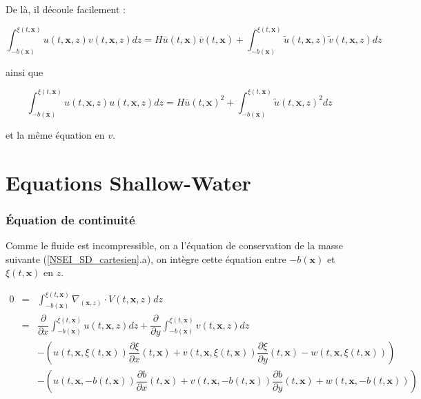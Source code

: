 \documentclass[10pt,a4paper]{amsart}
\def\gint{\displaystyle\int}
\begin{document}
De là, il découle facilement :

\begin{equation} \label{integrale1}
\gint_{-b(\textbf{x})}^{\xi(t,\textbf{x})} u(t,\textbf{x},z) v(t,\textbf{x},z) dz = H \overline{u}(t,\textbf{x}) \overline{v}(t,\textbf{x}) + \gint_{-b(\textbf{x})}^{\xi(t,\textbf{x})} \widetilde{u}(t,\textbf{x},z) \widetilde{v}(t,\textbf{x},z) dz
\end{equation}

ainsi que 

\begin{equation} \label{integrale2}
\gint_{-b(\textbf{x})}^{\xi(t,\textbf{x})} u(t,\textbf{x},z) u(t,\textbf{x},z) dz = H \overline{u}(t,\textbf{x})^2 + \gint_{-b(\textbf{x})}^{\xi(t,\textbf{x})} \widetilde{u}(t,\textbf{x},z)^2 dz
\end{equation}

et la même équation en $v$.

\part{Equations Shallow-Water} 

\section{\'Equation de continuité}


Comme le fluide est incompressible, on a l'équation de conservation de la masse suivante (\ref{NSEI_SD_cartesien}.a), on intègre cette équation entre $-b(\textbf{x})$ et $\xi(t,\textbf{x})$ en $z$.

$$\begin{array}{rcl}
0 & = & \gint_{-b(\textbf{x})}^{\xi(t,\textbf{x})}\nabla_{(\textbf{x},z)} \cdot V(t,\textbf{x},z) dz\\
  & = & \dfrac{\partial}{\partial x} \gint_{-b(\textbf{x})}^{\xi(t,\textbf{x})} u(t,\textbf{x},z) dz + \dfrac{\partial}{\partial y} \gint_{-b(\textbf{x})}^{\xi(t,\textbf{x})} v(t,\textbf{x},z) dz \\
  &   & - \left( u(t,\textbf{x}, \xi(t,\textbf{x})) \dfrac{\partial \xi}{\partial x}(t,\textbf{x}) + v(t,\textbf{x}, \xi(t,\textbf{x})) \dfrac{\partial \xi}{\partial y}(t,\textbf{x}) - w(t,\textbf{x}, \xi(t,\textbf{x})) \right)\\
    &   & - \left( u(t,\textbf{x}, -b(t,\textbf{x})) \dfrac{\partial b}{\partial x}(t,\textbf{x}) + v(t,\textbf{x}, -b(t,\textbf{x})) \dfrac{\partial b}{\partial y}(t,\textbf{x}) + w(t,\textbf{x}, -b(t,\textbf{x})) \right)
\end{array}$$
  
\end{document}
